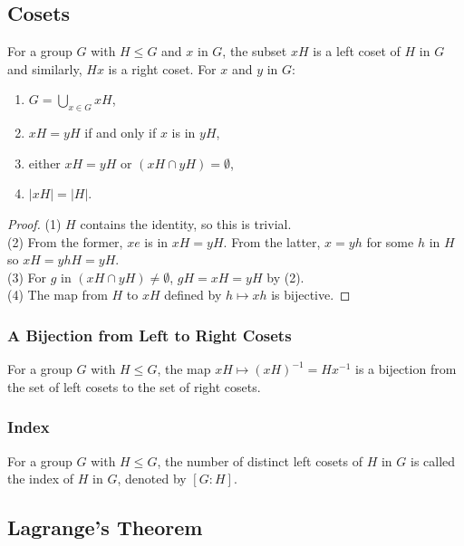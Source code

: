 \subsection{Cosets} \label{1.18}

For a group $G$ with $H \leq G$ and $x$ in $G$, the subset $xH$ is a left
coset of $H$ in $G$ and similarly, $Hx$ is a right coset. 
For $x$ and $y$ in $G$: \begin{enumerate}
    \item $G = \bigcup_{x \in G} xH$,
    \item $xH = yH$ if and only if $x$ is in $yH$,
    \item either $xH = yH$ or $(xH \cap yH) = \emptyset$,
    \item $|xH| = |H|$.
\end{enumerate}

\begin{proof}
    (1) $H$ contains the identity, so this is trivial. \\[\baselineskip]
    (2) From the former, $xe$ is in $xH = yH$. From the latter, $x = yh$ for
    some $h$ in $H$ so $xH = yhH = yH$. \\[\baselineskip]
    (3) For $g$ in $(xH \cap yH) \neq \emptyset$, $gH = xH = yH$ by (2). \\[\baselineskip]
    (4) The map from $H$ to $xH$ defined by $h \mapsto xh$ is bijective.
\end{proof}

\subsubsection{A Bijection from Left to Right Cosets} \label{1.17}

For a group $G$ with $H \leq G$, the map $xH \mapsto (xH)^{-1} = Hx^{-1}$ is a 
bijection from the set of left cosets to the set of right cosets.

\subsubsection{Index}

For a group $G$ with $H \leq G$, the number of distinct left cosets of $H$
in $G$ is called the index of $H$ in $G$, denoted by $[G : H]$.

\subsection{Lagrange's Theorem} \label{1.19}

